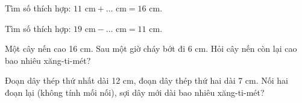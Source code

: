 \begin{ex} %
Tìm số thích hợp: $11\text{ cm} + \dots\text{ cm} = 16\text{ cm}$.
\end{ex}

\begin{ex} %
Tìm số thích hợp: $19\text{ cm} - \dots\text{ cm} = 11\text{ cm}$.
\end{ex}

\begin{ex} %
Một cây nến cao 16 cm. Sau một giờ cháy bớt đi 6 cm. Hỏi cây nến còn lại cao bao nhiêu xăng-ti-mét?
\end{ex}

\begin{ex} %
Đoạn dây thép thứ nhất dài 12 cm, đoạn dây thép thứ hai dài 7 cm. Nối hai đoạn lại (không tính mối nối), sợi dây mới dài bao nhiêu xăng-ti-mét?
\end{ex}
